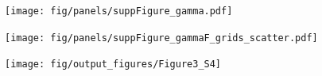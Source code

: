 \documentclass[a4paper,12pt]{article}
\newcommand{\ssc}[3]{\ensuremath{#1_{\text{#2}_{\text{#3}}}}}
\newcommand{\gE      }{\ssc{g}      {\scriptsize{E}}{}}
\newcommand{\gI      }{\ssc{g}      {\scriptsize{I}}{}}
\begin{document}
{%
%
%
%

\begin{figure}[p]
    \internallinenumbers
    \centering
        \texttt{[image: fig/panels/suppFigure\_gamma.pdf]}
    \caption{}
\end{figure}

\clearpage

\begin{figure}[ht!]
    \internallinenumbers
    \centering
        \texttt{[image: fig/panels/suppFigure\_gammaF\_grids\_scatter.pdf]}
    \caption{}
\end{figure}

\clearpage

\begin{figure}[p]
    \internallinenumbers
    \centering
        \texttt{[image: fig/output\_figures/Figure3\_S4]}
    \caption{}
\end{figure}

\clearpage

\setcounter{figure}{0}
\renewcommand{\figurename}{Figure 4 - figure supplement}

}
\end{document}
